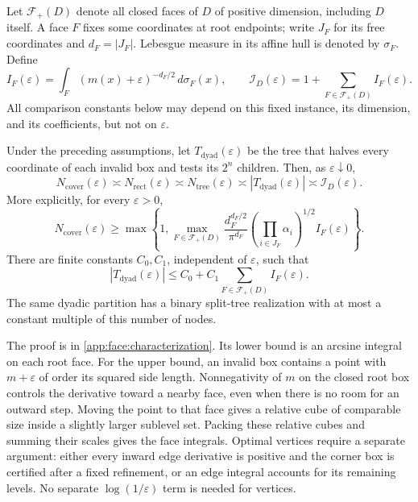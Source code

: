 Let $\mathcal F_+(D)$ denote all closed faces of $D$ of positive
dimension, including $D$ itself.  A face $F$ fixes some coordinates at
root endpoints; write $J_F$ for its free coordinates and
$d_F=|J_F|$.  Lebesgue measure in its affine hull is denoted by $\sigma_F$.
Define
\begin{equation}
 \label{face:eq:integral}
 I_F(\varepsilon)=
 \int_F(m(x)+\varepsilon)^{-d_F/2}\,d\sigma_F(x),\qquad
 \mathcal I_D(\varepsilon)=1+\sum_{F\in\mathcal F_+(D)}I_F(\varepsilon).
\end{equation}
All comparison constants below may depend on this fixed instance, its
dimension, and its coefficients, but not on $\varepsilon$.

\begin{theorem}
 \label{face:thm:characterization}
Under the preceding assumptions, let $T_{\mathrm{dyad}}(\varepsilon)$
be the tree that halves every coordinate of each invalid box and tests
its $2^n$ children.  Then, as $\varepsilon\downarrow0$,
\begin{equation}
 \label{face:eq:characterization}
 N_{\mathrm{cover}}(\varepsilon)
 \asymp N_{\mathrm{rect}}(\varepsilon)
 \asymp N_{\mathrm{tree}}(\varepsilon)
 \asymp |T_{\mathrm{dyad}}(\varepsilon)|
 \asymp \mathcal I_D(\varepsilon).
\end{equation}
More explicitly, for every $\varepsilon>0$,
\begin{equation}
 \label{face:eq:lower-explicit}
 N_{\mathrm{cover}}(\varepsilon)
 \ge
 \max\left\{1,
 \max_{F\in\mathcal F_+(D)}
 \frac{d_F^{d_F/2}}{\pi^{d_F}}
 \left(\prod_{i\in J_F}\alpha_i\right)^{1/2}
 I_F(\varepsilon)\right\}.
\end{equation}
There are finite constants $C_0,C_1$, independent of $\varepsilon$, such
that
\begin{equation}
 \label{face:eq:upper-explicit}
 |T_{\mathrm{dyad}}(\varepsilon)|
 \le C_0+C_1\sum_{F\in\mathcal F_+(D)}I_F(\varepsilon).
\end{equation}
The same dyadic partition has a binary split-tree realization with at
most a constant multiple of this number of nodes.
\end{theorem}

The proof is in \cref{app:face:characterization}.  Its lower bound is an
arcsine integral on each root face.  For the upper bound, an invalid box
contains a point with $m+\varepsilon$ of order its squared side length.
Nonnegativity of $m$ on the closed root box controls the derivative
toward a nearby face, even when there is no room for an outward step.
Moving the point to that face gives a relative cube of comparable size
inside a slightly larger sublevel set.  Packing these relative cubes
and summing their scales gives the face integrals.  Optimal vertices
require a separate argument: either every inward edge derivative is
positive and the corner box is certified after a fixed refinement, or
an edge integral accounts for its remaining levels.  No separate
$\log(1/\varepsilon)$ term is needed for vertices.

